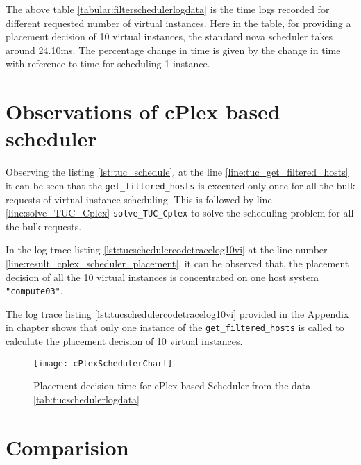 The above table \ref{tabular:filterschedulerlogdata} is the time logs recorded for different requested number of virtual instances.
Here in the table, for providing a placement decision of 10 virtual instances, the standard nova scheduler takes around 24.10ms.
The percentage change in time is given by the change in time with reference to time for scheduling 1 instance.

\section{Observations of cPlex based scheduler}\label{sec:observationsoftucscheduler}

Observing the listing \ref{lst:tuc_schedule}, at the line \ref{line:tuc_get_filtered_hosts} it can be seen that the \verb|get_filtered_hosts| is executed only once for all the bulk requests of virtual instance scheduling.
This is followed by line \ref{line:solve_TUC_Cplex} \verb|solve_TUC_Cplex| to solve the scheduling problem for all the bulk requests.

In the log trace listing \ref{lst:tucschedulercodetracelog10vi} at the line number \ref{line:result_cplex_scheduler_placement}, it can be observed that, the placement decision of all the 10 virtual instances is concentrated on one host system \verb|"compute03"|.

The log trace listing \ref{lst:tucschedulercodetracelog10vi} provided in the Appendix  in chapter  shows that only one instance of the \verb|get_filtered_hosts| is called to calculate the placement decision of 10 virtual instances.

\begin{figure}[H]
	\begin{center}
		\texttt{[image: cPlexSchedulerChart]}
		\caption{Placement decision time for cPlex based Scheduler from the data \ref{tab:tucschedulerlogdata}}
		\label{fig:cPlexSchedulerChart}
	\end{center}
	\vspace{-10pt}
\end{figure}

\section{Comparision}\label{sec:comparision}

